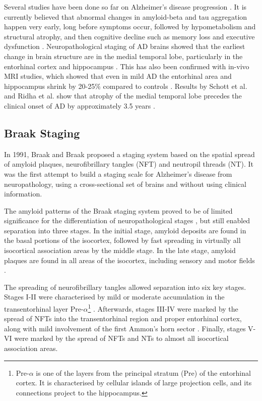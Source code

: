 Several studies have been done so far on Alzheimer's disease progression \cite{jack2010hypothetical, ridha2006tracking,fox1999correlation, scahill2002mapping, braak1991neuropathological,schott2003assessing}. It is currently believed that abnormal changes in amyloid-beta and tau aggregation happen very early, long before symptoms occur, followed by hypometabolism and structural atrophy, and then cognitive decline such as memory loss and executive dysfunction \cite{jack2010hypothetical,jack2013tracking}.  Neuropathological staging of AD brains showed that the earliest change in brain structure are in the medial temporal lobe, particularly in the entorhinal cortex and hippocampus \cite{braak1991neuropathological}. This has also been confirmed with in-vivo MRI studies, which showed that even in mild AD the entorhinal area and hippocampus shrink by 20-25\% compared to controls \cite{jack1997medial, lehericy1994amygdalohippocampal, juottonen1999comparative, bobinski1999histological}. Results by Schott et al. \cite{schott2003assessing} and Ridha et al. \cite{ridha2006tracking} show that atrophy of the medial temporal lobe precedes the clinical onset of AD by approximately 3.5 years \cite{schott2003assessing}. 

\subsection{Braak Staging}
\label{sec:bckBraak}

In 1991, Braak and Braak \cite{braak1991neuropathological} proposed a staging system based on the spatial spread of amyloid plaques, neurofibrillary tangles (NFT) and neutropil threads (NT). It was the first attempt to build a staging scale for Alzheimer's disease from neuropathology, using a cross-sectional set of brains and without using clinical information.

The amyloid patterns of the Braak staging system proved to be of limited significance for the differentiation of neuropathological stages \cite{braak1991neuropathological}, but still enabled separation into three stages. In the initial stage, amyloid deposits are found in the basal portions of the isocortex, followed by fast spreading in virtually all isocortical association areas by the middle stage. In the late stage, amyloid plaques are found in all areas of the isocortex, including sensory and motor fields \cite{braak1991neuropathological}.

The spreading of neurofibrillary tangles allowed separation into six key stages. Stages I-II were characterised by mild or moderate accumulation in the transentorhinal layer Pre-$\alpha$\footnote{Pre-$\alpha$ is one of the layers from the principal stratum (Pre) of the entorhinal cortex. It is characterised by cellular islands of large projection cells, and its connections project to the hippocampus.} \cite{braak1991neuropathological}. Afterwards, stages III-IV were marked by the spread of NFTs into the transentorhinal region and proper entorhinal cortex, along with mild involvement of the first Ammon's horn sector \cite{braak1991neuropathological}. Finally, stages V-VI were marked by the spread of NFTs and NTs to almost all isocortical association areas. \cite{braak1991neuropathological}

